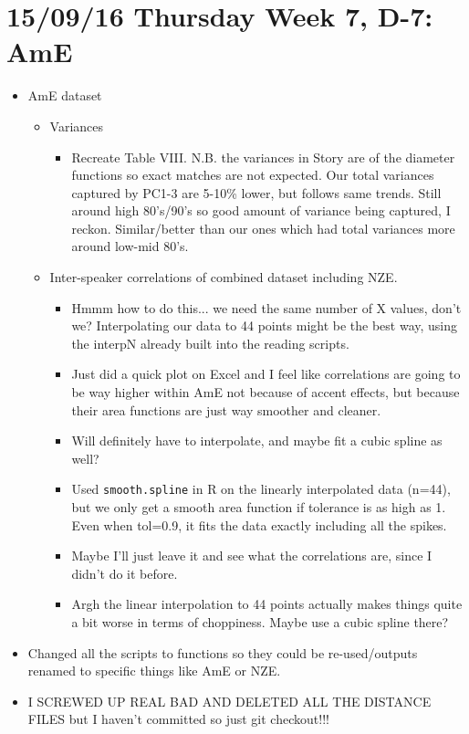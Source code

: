 \documentclass{article}
\begin{document}
\section*{15/09/16 Thursday Week 7, D-7: AmE}
\begin{itemize}
    \item AmE dataset
    \begin{itemize}
        \item Variances
        \begin{itemize}
            \item Recreate Table VIII. N.B. the variances in Story are of the diameter functions so exact matches are not expected. Our total variances captured by PC1-3 are 5-10\% lower, but follows same trends. Still around high 80's/90's so good amount of variance being captured, I reckon. Similar/better than our ones which had total variances more around low-mid 80's.
        \end{itemize}
        \item Inter-speaker correlations of combined dataset including NZE.
        \begin{itemize}
            \item Hmmm how to do this... we need the same number of X values, don't we? Interpolating our data to 44 points might be the best way, using the interpN already built into the reading scripts.
            \item Just did a quick plot on Excel and I feel like correlations are going to be way higher within AmE not because of accent effects, but because their area functions are just way smoother and cleaner.
            \item Will definitely have to interpolate, and maybe fit a cubic spline as well? 
            \item Used \verb|smooth.spline| in R on the linearly interpolated data (n=44), but we only get a smooth area function if tolerance is as high as 1. Even when tol=0.9, it fits the data exactly including all the spikes.
            \item Maybe I'll just leave it and see what the correlations are, since I didn't do it before.
            \item Argh the linear interpolation to 44 points actually makes things quite a bit worse in terms of choppiness. Maybe use a cubic spline there?
        \end{itemize}
    \end{itemize}
    \item Changed all the scripts to functions so they could be re-used/outputs renamed to specific things like AmE or NZE.
    \item I SCREWED UP REAL BAD AND DELETED ALL THE DISTANCE FILES but I haven't committed so just git checkout!!!
\end{itemize}
\end{document}
